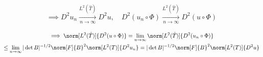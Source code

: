 \begin{solution}
\begin{align*}
  \implies
  D^2 u_n \xrightarrow[n \to \infty]{L^2(\hat T)} D^2 u,
  \quad
  D^2 (u_n \circ \Phi) \xrightarrow[n \to \infty]{L^2(\hat T)} D^2 (u \circ \Phi)
\end{align*}


\begin{multline*}
  \implies
  \norm[L^2(\hat T)]{D^2(u\circ\Phi)}
  =
  \lim_{n \to \infty}
  \norm[L^2(\hat T)]{D^2(u_n\circ\Phi)} \\
  \leq
  \lim_{n \to \infty}
  |\det B|^{-1/2}
  \norm[F]{B}^2
  \norm[L^2(T)]{D^2 u_n}
  =
  |\det B|^{-1/2}
  \norm[F]{B}^2
  \norm[L^2(T)]{D^2 u}
\end{multline*}

\end{solution}

